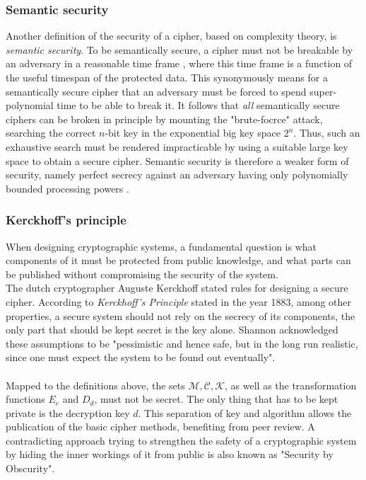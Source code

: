 \subsubsection{Semantic security}

Another definition of the security of a cipher, based on complexity theory, is \textit{semantic security}.
To be semantically secure, a cipher must not be breakable by an adversary in a reasonable time
frame \cite{handbook1}, where this time frame is a function of the useful timespan of the protected data. This synonymously means for a semantically secure
cipher that an adversary must be forced to spend super-polynomial time to be able to break it. It follows that \textit{all} semantically secure ciphers
can be broken in principle by mounting the "brute-focrce" attack, searching the correct $n$-bit key in the exponential big key space $2^n$. Thus, such an
exhaustive search must be rendered impracticable by using a suitable large key space to obtain a secure cipher.
Semantic security is therefore a weaker form of security, namely perfect secrecy against an adversary having only polynomially bounded
processing powers \cite{GoldwasserMicali}.

\subsubsection{Kerckhoff's principle}
When designing cryptographic systems, a fundamental question is what components of it must be protected from public knowledge, and what parts can be
published without compromising the security of the system. 
\\
The dutch cryptographer Auguste Kerckhoff stated rules for designing a secure cipher.
According to \textit{Kerckhoff's Principle} stated in the year 1883, among other properties, a secure system should not rely on the secrecy of
its components, the only part that should be kept secret is the key alone. Shannon acknowledged these assumptions to be "pessimistic and hence safe, but 
in the long run realistic, since one must expect the system to be found out eventually".
\\
\\
Mapped to the definitions above, the sets $\mathcal{M, C, K}$, as well as the
transformation functions $E_e$ and $D_d$, must not be secret. The only thing that has to be kept private is the decryption key $d$.
This separation of key and algorithm allows the publication of the basic cipher methods, benefiting from peer review. A contradicting approach 
trying to strengthen the safety of a cryptographic system by hiding the inner workings of it from public is also known as "Security by Obscurity".


